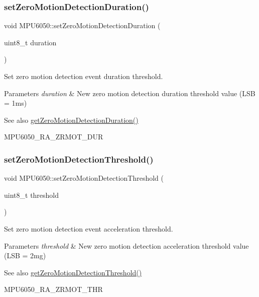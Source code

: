 \subsubsection{\texorpdfstring{setZeroMotionDetectionDuration()}{setZeroMotionDetectionDuration()}}
{\footnotesize\ttfamily void M\+P\+U6050\+::set\+Zero\+Motion\+Detection\+Duration (\begin{DoxyParamCaption}\item[{uint8\+\_\+t}]{duration }\end{DoxyParamCaption})}

Set zero motion detection event duration threshold. 
\begin{DoxyParams}{Parameters}
{\em duration} & New zero motion detection duration threshold value (L\+SB = 1ms) \\
\hline
\end{DoxyParams}
\begin{DoxySeeAlso}{See also}
\mbox{\hyperlink{class_m_p_u6050_a04c0fcdcd0157b6dbf74d4901424801e}{get\+Zero\+Motion\+Detection\+Duration()}} 

M\+P\+U6050\+\_\+\+R\+A\+\_\+\+Z\+R\+M\+O\+T\+\_\+\+D\+UR 
\end{DoxySeeAlso}
\mbox{\label{class_m_p_u6050_a347a51fd25de20b9ead4659015ef793b}} 
\subsubsection{\texorpdfstring{setZeroMotionDetectionThreshold()}{setZeroMotionDetectionThreshold()}}
{\footnotesize\ttfamily void M\+P\+U6050\+::set\+Zero\+Motion\+Detection\+Threshold (\begin{DoxyParamCaption}\item[{uint8\+\_\+t}]{threshold }\end{DoxyParamCaption})}

Set zero motion detection event acceleration threshold. 
\begin{DoxyParams}{Parameters}
{\em threshold} & New zero motion detection acceleration threshold value (L\+SB = 2mg) \\
\hline
\end{DoxyParams}
\begin{DoxySeeAlso}{See also}
\mbox{\hyperlink{class_m_p_u6050_ad941c1e844dc9230675c115734599ea3}{get\+Zero\+Motion\+Detection\+Threshold()}} 

M\+P\+U6050\+\_\+\+R\+A\+\_\+\+Z\+R\+M\+O\+T\+\_\+\+T\+HR 
\end{DoxySeeAlso}
\mbox{\label{class_m_p_u6050_af5b5bc39b66466ba910f6eef1259444c}} 
